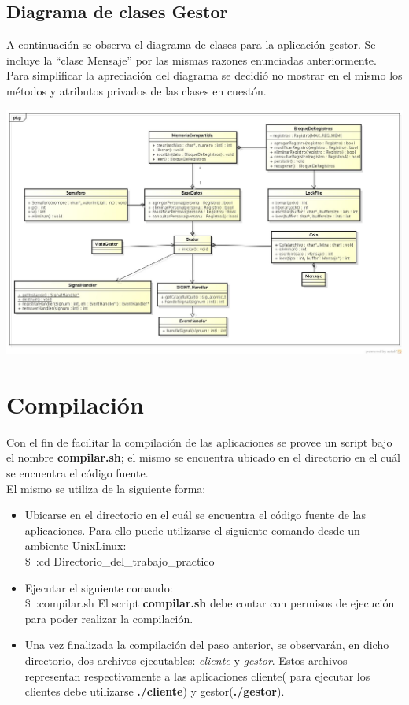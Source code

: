 \documentclass[11pt]{article}
\begin{document}
\subsection{Diagrama de clases Gestor}
A continuaci\'on se observa el diagrama de clases para la aplicaci\'on gestor. Se incluye la ``clase Mensaje'' por las mismas razones enunciadas anteriormente.
Para simplificar la apreciaci\'on del diagrama se decidi\'o no mostrar en el mismo los m\'etodos y atributos privados de las clases en cuest\'on.

\begin{center}
\includegraphics[scale=0.45, height=0.93\textheight,width=1.02\textwidth]{ClasesGestor} 
\end{center}

\newpage
\section{Compilaci\'on}
Con el fin de facilitar la compilaci\'on de las aplicaciones se provee un script bajo el nombre {\bf compilar.sh}; el mismo se encuentra ubicado en 
el directorio en el cu\'al se encuentra el c\'odigo fuente. \\
El mismo se utiliza de la siguiente forma:
\begin{itemize}
 \item Ubicarse en el directorio en el cu\'al se encuentra el c\'odigo fuente de las aplicaciones. Para ello puede utilizarse el siguiente 
comando desde un ambiente Unix\/Linux:\\
\$~:cd Directorio\_del\_trabajo\_practico
\item Ejecutar el siguiente comando: \\
\$~:compilar.sh
\subitem * El script {\bf compilar.sh} debe contar con permisos de ejecuci\'on para poder realizar la compilaci\'on.
\item Una vez finalizada la compilaci\'on del paso anterior, se observar\'an, en dicho directorio, dos archivos ejecutables: \textit{cliente} y \textit{gestor}. 
Estos archivos representan respectivamente a las aplicaciones cliente( para ejecutar los clientes debe utilizarse {\bf ./cliente}) y gestor({\bf ./gestor}). 
\end{itemize}
\end{document}
